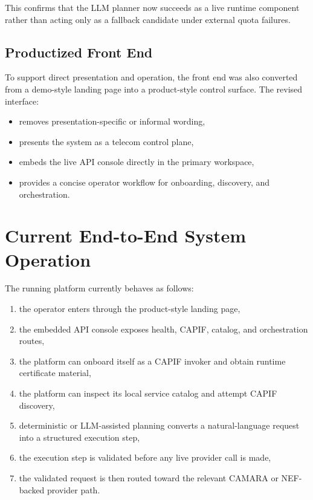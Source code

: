\documentclass[conference]{IEEEtran}
\begin{document}
This confirms that the LLM planner now succeeds as a live runtime component rather than acting only as a fallback candidate under external quota failures.

\subsection{Productized Front End}

To support direct presentation and operation, the front end was also converted from a demo-style landing page into a product-style control surface. The revised interface:

\begin{itemize}[leftmargin=1.1em]
\item removes presentation-specific or informal wording,
\item presents the system as a telecom control plane,
\item embeds the live API console directly in the primary workspace,
\item provides a concise operator workflow for onboarding, discovery, and orchestration.
\end{itemize}

\section{Current End-to-End System Operation}

The running platform currently behaves as follows:

\begin{enumerate}[leftmargin=1.1em]
\item the operator enters through the product-style landing page,
\item the embedded API console exposes health, CAPIF, catalog, and orchestration routes,
\item the platform can onboard itself as a CAPIF invoker and obtain runtime certificate material,
\item the platform can inspect its local service catalog and attempt CAPIF discovery,
\item deterministic or LLM-assisted planning converts a natural-language request into a structured execution step,
\item the execution step is validated before any live provider call is made,
\item the validated request is then routed toward the relevant CAMARA or NEF-backed provider path.
\end{enumerate}
\end{document}
